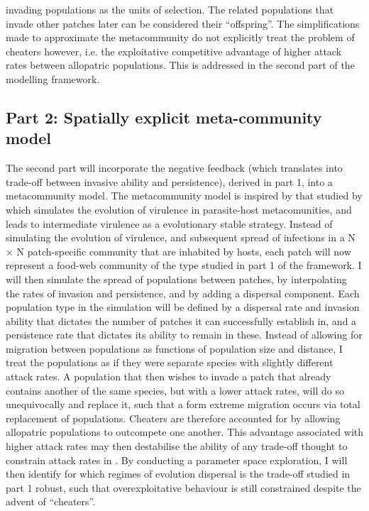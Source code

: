 \documentclass[a4paper]{report}
\begin{document}
invading populations as the units of selection. The related populations that invade other patches later can be considered their “offspring”. The simplifications made to approximate the metacommunity do not explicitly treat the problem of cheaters however, i.e. the exploitative competitive advantage of higher attack rates between allopatric populations. This is addressed in the second part of the modelling framework.

\subsection{Part 2: Spatially explicit meta-community model}

The second part will incorporate the negative feedback (which translates into trade-off between invasive ability and persistence), derived in part 1, into a metacommunity model. The metacommunity model is inspired by that studied by \citep{Goodnight2008} which simulates the evolution of virulence in parasite-host metacomunities, and leads to intermediate virulence as a evolutionary stable strategy. Instead of simulating the evolution of virulence, and subsequent spread of infections in a N $\times$ N patch-specific community that are inhabited by hosts, each patch will now represent a food-web community of the type studied in part 1 of the framework. I will then simulate the spread of populations between patches, by interpolating the rates of invasion and persistence, and by adding a dispersal component. Each population type in the simulation will be defined by a dispersal rate and invasion ability that dictates the number of patches it can successfully establish in, and a persistence rate that dictates its ability to remain in these. Instead of allowing for migration between populations as functions of population size and distance, I treat the populations as if they were separate species with slightly different attack rates. A population that then wishes to invade a patch that already contains another of the same species, but with a lower attack rates, will do so unequivocally and replace it, such that a form extreme migration occurs via total replacement of populations. Cheaters are therefore accounted for by allowing allopatric populations to outcompete one another. This advantage associated with higher attack rates may then destabilise the ability of any trade-off thought to constrain attack rates in \citep{Rossberg2008}. By conducting a parameter space exploration, I will then identify for which regimes of evolution dispersal is the trade-off studied in part 1 robust, such that overexploitative behaviour is still constrained despite the advent of “cheaters”. \\
\end{document}
